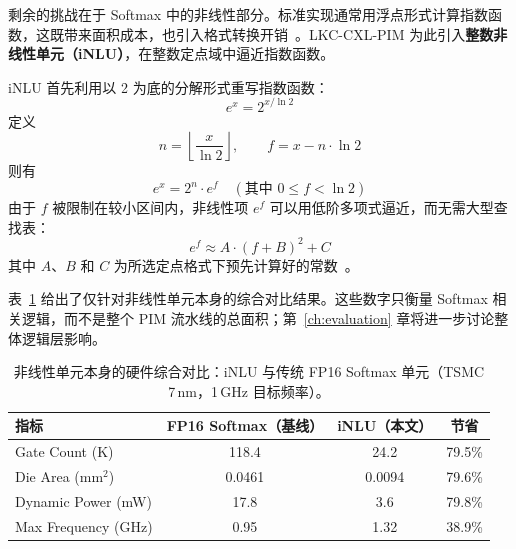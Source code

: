 剩余的挑战在于 Softmax 中的非线性部分。标准实现通常用浮点形式计算指数函数，这既带来面积成本，也引入格式转换开销~\cite{flashattn2, newton_aim}。LKC-CXL-PIM 为此引入\textbf{整数非线性单元（iNLU）}，在整数定点域中逼近指数函数。

iNLU 首先利用以 2 为底的分解形式重写指数函数：
\begin{equation}
e^x = 2^{x / \ln 2}
\end{equation}
定义
\begin{equation}
n = \left\lfloor \frac{x}{\ln 2} \right\rfloor, \qquad f = x - n \cdot \ln 2
\end{equation}
则有
\begin{equation}
e^x = 2^n \cdot e^f \quad (\text{其中 } 0 \leq f < \ln 2)
\end{equation}
由于 $f$ 被限制在较小区间内，非线性项 $e^f$ 可以用低阶多项式逼近，而无需大型查找表：
\begin{equation}
e^f \approx A \cdot (f + B)^2 + C
\end{equation}
其中 $A$、$B$ 和 $C$ 为所选定点格式下预先计算好的常数~\cite{llm_int8}。

表~\ref{tab:synthesis_results} 给出了仅针对非线性单元本身的综合对比结果。这些数字只衡量 Softmax 相关逻辑，而不是整个 PIM 流水线的总面积；第~\ref{ch:evaluation} 章将进一步讨论整体逻辑层影响。

\begin{table}[htbp]
\centering
\caption[非线性单元综合对比]{非线性单元本身的硬件综合对比：iNLU 与传统 FP16 Softmax 单元（TSMC 7\,nm，1\,GHz 目标频率）。}
\label{tab:synthesis_results}
\begin{tabular}{lccc}
\toprule
\textbf{指标} & \textbf{FP16 Softmax（基线）} & \textbf{iNLU（本文）} & \textbf{节省} \\
\midrule
Gate Count (K)          & 118.4  & 24.2   & 79.5\% \\
Die Area (mm$^2$)       & 0.0461 & 0.0094 & 79.6\% \\
Dynamic Power (mW)      & 17.8   & 3.6    & 79.8\% \\
Max Frequency (GHz)     & 0.95   & 1.32   & 38.9\% \\
\bottomrule
\end{tabular}
\end{table}

